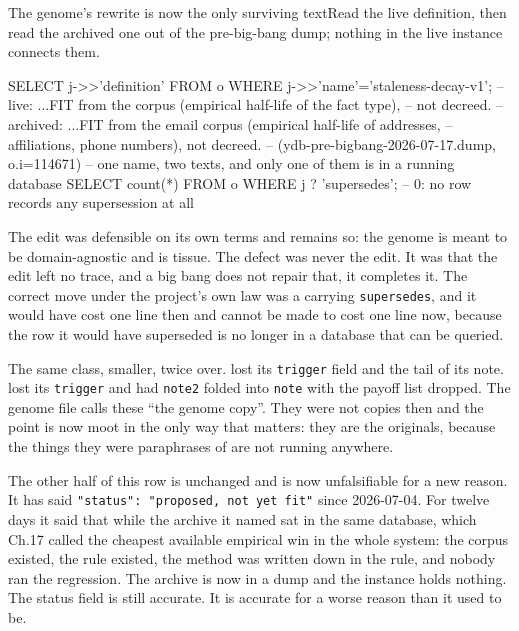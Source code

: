 \begin{Correspondence}{The genome's rewrite is now the only surviving text}{Read the live definition, then read the archived one out of the pre-big-bang dump; nothing in the live instance connects them.}
\begin{Check}
SELECT j->>'definition' FROM o WHERE j->>'name'='staleness-decay-v1';
-- live:     ...FIT from the corpus (empirical half-life of the fact type),
--              not decreed.
-- archived: ...FIT from the email corpus (empirical half-life of addresses,
--              affiliations, phone numbers), not decreed.
--              (ydb-pre-bigbang-2026-07-17.dump, o.i=114671)
-- one name, two texts, and only one of them is in a running database
SELECT count(*) FROM o WHERE j ? 'supersedes';   -- 0: no row records any supersession at all
\end{Check}
The edit was defensible on its own terms and remains so: the genome is meant to be domain-agnostic and \labDomain{} is \labLineageName{} tissue. The defect was never the edit. It was that the edit left no trace, and a big bang does not repair that, it completes it. The correct move under the project's own law was a  carrying \texttt{supersedes}, and it would have cost one line then and cannot be made to cost one line now, because the row it would have superseded is no longer in a database that can be queried.
\end{Correspondence}

The same class, smaller, twice over.  lost its \texttt{trigger} field and the tail of its note.  lost its \texttt{trigger} and had \texttt{note2} folded into \texttt{note} with the payoff list dropped. The genome file calls these ``the genome copy''. They were not copies then and the point is now moot in the only way that matters: they are the originals, because the things they were paraphrases of are not running anywhere.

The other half of this row is unchanged and is now unfalsifiable for a new reason. It has said \texttt{"status": "proposed, not yet fit"} since 2026-07-04. For twelve days it said that while the \labDomain{} archive it named sat in the same database, which Ch.17 called the cheapest available empirical win in the whole system: the corpus existed, the rule existed, the method was written down in the rule, and nobody ran the regression. The archive is now in a dump and the instance holds nothing. The status field is still accurate. It is accurate for a worse reason than it used to be.

